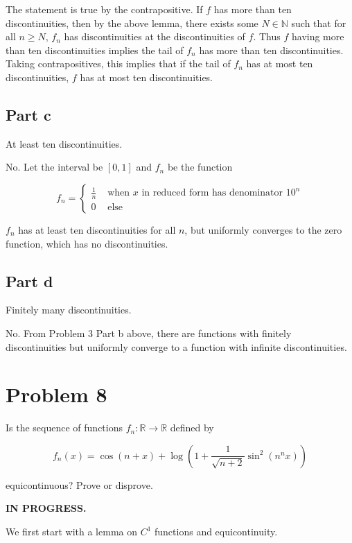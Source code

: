 \documentclass{article}
\newcommand{\R}{\mathbb{R}}
\newcommand{\N}{\mathbb{N}}
\begin{document}
The statement is true by the contrapositive. If $f$ has more than ten discontinuities, then by the above lemma, there exists some $N \in \N$ such that for all $n \geq N$, $f_n$ has discontinuities at the discontinuities of $f$. Thus $f$ having more than ten discontinuities implies the tail of $f_n$ has more than ten discontinuities. Taking contrapositives, this implies that if the tail of $f_n$ has at most ten discontinuities, $f$ has at most ten discontinuities.

\subsection*{Part c}

At least ten discontinuities.

No. Let the interval be $[0, 1]$ and $f_n$ be the function

\[
f_n = 
\begin{cases}
\frac{1}{n} & \text{ when } x \text{ in reduced form has denominator } 10^n \\
0 & \text{ else}
\end{cases}
\]

$f_n$ has at least ten discontinuities for all $n$, but uniformly converges to the zero function, which has no discontinuities.

\subsection*{Part d}

Finitely many discontinuities.

No. From Problem 3 Part b above, there are functions with finitely discontinuities but uniformly converge to a function with infinite discontinuities.

\section*{Problem 8}

Is the sequence of functions $f_n: \R \rightarrow \R$ defined by

\[
f_n(x) = \cos(n+x) + \log(1 + \frac{1}{\sqrt{n+2}} \sin^2(n^n x))
\]

equicontinuous? Prove or disprove.

\textbf{IN PROGRESS.}

We first start with a lemma on $C^1$ functions and equicontinuity.
\end{document}
